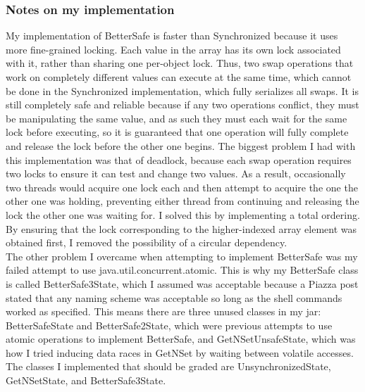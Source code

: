 \documentclass[letterpaper,twocolumn,10pt]{article}
\begin{document}
\subsubsection{Notes on my implementation}
My implementation of BetterSafe is faster than Synchronized because it uses more fine-grained locking. Each value in the array has its own lock associated with it, rather than sharing one per-object lock. Thus, two swap operations that work on completely different values can execute at the same time, which cannot be done in the Synchronized implementation, which fully serializes all swaps. It is still completely safe and reliable because if any two operations conflict, they must be manipulating the same value, and as such they must each wait for the same lock before executing, so it is guaranteed that one operation will fully complete and release the lock before the other one begins. The biggest problem I had with this implementation was that of deadlock, because each swap operation requires two locks to ensure it can test and change two values. As a result, occasionally two threads would acquire one lock each and then attempt to acquire the one the other one was holding, preventing either thread from continuing and releasing the lock the other one was waiting for. I solved this by implementing a total ordering. By ensuring that the lock corresponding to the higher-indexed array element was obtained first, I removed the possibility of a circular dependency. \\
The other problem I overcame when attempting to implement BetterSafe was my failed attempt to use java.util.concurrent.atomic. This is why my BetterSafe class is called BetterSafe3State, which I assumed was acceptable because a Piazza post stated that any naming scheme was acceptable so long as the shell commands worked as specified. This means there are three unused classes in my jar: BetterSafeState and BetterSafe2State, which were previous attempts to use atomic operations to implement BetterSafe, and GetNSetUnsafeState, which was how I tried inducing data races in GetNSet by waiting between volatile accesses. The classes I implemented that should be graded are UnsynchronizedState, GetNSetState, and BetterSafe3State.
\end{document}
